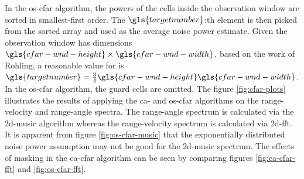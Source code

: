In the \gls{os}-\gls{cfar} algorithm, the powers of the cells inside the observation window are sorted in smallest-first order.
The $\gls{targetnumber}$:th element is then picked from the sorted array and used as the average noise power estimate.
Given the observation window has dimensions $\gls{cfar-wnd-height} \times \gls{cfar-wnd-width}$, based on the work of Rohling, a reasonable value for is $\gls{targetnumber} = \frac{3}{4}\gls{cfar-wnd-height}\gls{cfar-wnd-width}$.
In the \gls{os}-\gls{cfar} algorithm, the guard cells are omitted.
\cite{radar-cfar-thresholding-in-clitter-and-multiple-target-situations}
The figure \ref{fig:cfar-plots} illustrates the results of applying the \gls{ca}- and \gls{os}-\gls{cfar} algorithms
on the range-velocity and range-angle spectra. The range-angle spectrum is calculated via the \gls{2d-music} algorithm whereas the range-velocity
spectrum is calculated via \gls{2d-fft}.
It is apparent from figure \ref{fig:os-cfar-music} that the exponentially distributed noise power assumption may not be good for the \gls{2d-music} spectrum.
The effects of masking in the \gls{ca}-\gls{cfar} algorithm can be seen by comparing figures \ref{fig:ca-cfar-fft} and \ref{fig:os-cfar-fft}.

